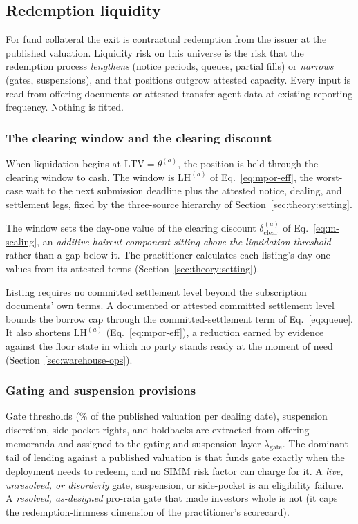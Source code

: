 \subsection{Redemption liquidity}\label{sec:tax-redemption}
For fund collateral the exit is contractual redemption from the issuer at the published valuation. Liquidity risk on this universe is the risk that the redemption process \emph{lengthens} (notice periods, queues, partial fills) or \emph{narrows} (gates, suspensions), and that positions outgrow attested capacity. Every input is read from offering documents or attested transfer-agent data at existing reporting frequency. Nothing is fitted.

\subsubsection{The clearing window and the clearing discount}
When liquidation begins at $\mathrm{LTV}=\theta^{(a)}$, the position is held through the clearing
window to cash. The window is $\mathrm{LH}^{(a)}$ of Eq.~\eqref{eq:mpor-eff}, the worst-case
wait to the next submission deadline plus the attested notice, dealing, and settlement legs,
fixed by the three-source hierarchy of Section~\ref{sec:theory:setting}.

The window sets the day-one value of the clearing discount $\delta_{\mathrm{clear}}^{(a)}$ of
Eq.~\eqref{eq:m-scaling}, an \emph{additive haircut component sitting above the liquidation
threshold} rather than a gap below it. The practitioner calculates each listing's day-one
values from its attested terms (Section~\ref{sec:theory:setting}).

Listing requires no committed settlement level beyond the subscription documents' own
terms. A documented or attested committed settlement level bounds the borrow cap through the
committed-settlement term of Eq.~\eqref{eq:queue}. It also shortens $\mathrm{LH}^{(a)}$
(Eq.~\eqref{eq:mpor-eff}), a reduction earned by evidence against the floor state in which
no party stands ready at the moment of need (Section~\ref{sec:warehouse-ops}).

\subsubsection{Gating and suspension provisions}
Gate thresholds (\% of the published valuation per dealing date), suspension discretion, side-pocket rights, and holdbacks are extracted from offering memoranda and assigned to the gating and suspension layer $\lambda_{\mathrm{gate}}$. The dominant tail of lending against a published valuation is that funds gate exactly when the deployment needs to redeem, and no SIMM risk factor can charge for it. A \emph{live, unresolved, or disorderly} gate, suspension, or side-pocket is an eligibility failure. A \emph{resolved, as-designed} pro-rata gate that made investors whole is not (it caps the redemption-firmness dimension of the practitioner's scorecard).

